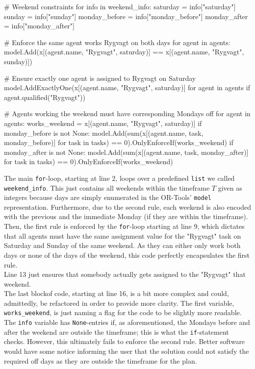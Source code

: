 \begin{python}
# Weekend constraints
for info in weekend_info:
    saturday = info["saturday"]
    sunday = info["sunday"]
    monday_before = info["monday_before"]
    monday_after = info["monday_after"]

    # Enforce the same agent works Rygvagt on both days
    for agent in agents:
        model.Add(x[(agent.name, "Rygvagt", saturday)] == x[(agent.name, "Rygvagt", sunday)])

    # Ensure exactly one agent is assigned to Rygvagt on Saturday
    model.AddExactlyOne(x[(agent.name, "Rygvagt", saturday)] for agent in agents if agent.qualified("Rygvagt"))

    # Agents working the weekend must have corresponding Mondays off
    for agent in agents:
        works_weekend = x[(agent.name, "Rygvagt", saturday)]
        if monday_before is not None:
            model.Add(sum(x[(agent.name, task, monday_before)] for task in tasks) == 0).OnlyEnforceIf(works_weekend)
        if monday_after is not None:
            model.Add(sum(x[(agent.name, task, monday_after)] for task in tasks) == 0).OnlyEnforceIf(works_weekend)
\end{python}
The main \texttt{for}-loop, starting at line 2, loops over a predefined \texttt{list} we called \texttt{weekend_info}. This just contains all weekends within the timeframe \(T\) given as integers because days are simply enumerated in the OR-Tools' \texttt{model} representation. Furthermore, due to the second rule, each weekend is also encoded with the previous and the immediate Monday (if they are within the timeframe). 
\\
Then, the first rule is enforced by the \texttt{for}-loop starting at line 9, which dictates that all agents must have the same assignment value for the "Rygvagt" task on Saturday and Sunday of the same weekend. As they can either only work both days or none of the days of the weekend, this code perfectly encapsulates the first rule.
\\
Line 13 just ensures that somebody actually gets assigned to the "Rygvagt" that weekend.
\\
The last blockof code, starting at line 16, is a bit more complex and could, admittedly, be refactored in order to provide more clarity. The first variable, \texttt{works_weekend}, is just naming a flag for the code to be slightly more readable. The \texttt{info} variable has \texttt{None}-entries if, as aforementioned, the Mondays before and after the weekend are outside the timeframe; this is what the \texttt{if}-statement checks. However, this ultimately fails to enforce the second rule. Better software would have some notice informing the user that the solution could not satisfy the required off days as they are outside the timeframe for the plan.
